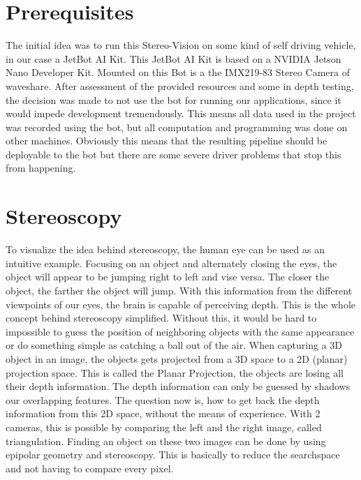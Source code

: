 \documentclass[journal,onecolumn]{IEEEtran}
\begin{document}
\section{Prerequisites}
\noindent The initial idea was to run this Stereo-Vision on some kind of self driving vehicle, in our case a JetBot AI Kit\cite{jetbot_wiki}. This JetBot AI Kit is based on a NVIDIA Jetson Nano Developer Kit\cite{nvidia_jetson}. Mounted on this Bot is a the IMX219-83 Stereo Camera\cite{cam_wiki} of waveshare. After assessment of the provided resources and some in depth testing, the decision was made to not use the bot for running our applications, since it would impede development tremendously. This means all data used in the project was recorded using the bot, but all computation and programming was done on other machines. Obviously this means that the resulting pipeline should be deployable to the bot but there are some severe driver problems that stop this from happening.
\section{Stereoscopy}
\noindent
To visualize the idea behind stereoscopy, the human eye can be used as an intuitive example. Focusing on an object and alternately closing the eyes, the object will appear to be jumping right to left and vise versa. The closer the object, the farther the object will jump. With this information from the different viewpoints of our eyes, the brain is capable of perceiving depth. This is the whole concept behind stereoscopy simplified. Without this, it would be hard to impossible to guess the position of neighboring objects with the same appearance or do something simple as catching a ball out of the air.
When capturing a 3D object in an image, the objects gets projected from a 3D space to a 2D (planar) projection space. This is called the Planar Projection, the objects are losing all their depth information. The depth information can only be guessed by shadows our overlapping features. The question now is, how to get back the depth information from this 2D space, without the means of experience.
With 2 cameras, this is possible by comparing the left and the right image, called triangulation.
Finding an object on these two images can be done by using epipolar geometry and stereoscopy. This is basically to reduce the searchspace and not having to compare every pixel.
\end{document}
